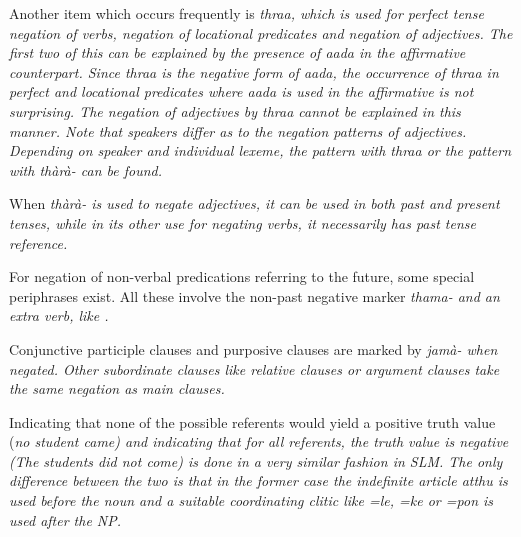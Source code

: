 Another item which occurs frequently is \em thraa\em, which is used for perfect tense negation of verbs, negation of locational predicates and negation of adjectives. The first two of this can be explained by the presence of \em aada \em in the affirmative counterpart. Since \em thraa \em is the negative form of \em aada\em, the occurrence of \em thraa \em in perfect and locational predicates where \em aada \em is used in the affirmative is not surprising. The negation of adjectives by \em thraa \em cannot be explained in this manner. Note that speakers differ as to the negation patterns of adjectives. Depending on speaker and individual lexeme, the pattern with \em thraa \em or the pattern with \em thàrà-	 \em can be found.

When \em thàrà- \em is used to negate adjectives, it can be used in both past and present tenses, while in its other use for negating verbs, it necessarily has past tense reference.

For negation of non-verbal predications referring to the future, some special periphrases exist. All these involve the non-past negative marker \em thama- \em and an extra verb, like .

Conjunctive participle clauses and purposive clauses are marked by \em jamà- \em when negated. Other subordinate clauses like relative clauses or argument clauses take the same negation as main clauses.

Indicating that none of the possible referents would yield a positive truth value (\em no student came\em) and indicating that for all referents, the truth value is negative (\em The students did not come\em) is done in a very similar fashion in SLM. The only difference between the two is that in the former case the indefinite article \em atthu \em is used before  the noun and a suitable coordinating clitic like \em =le\em, \em =ke \em or \em =pon \em is used after the NP.





